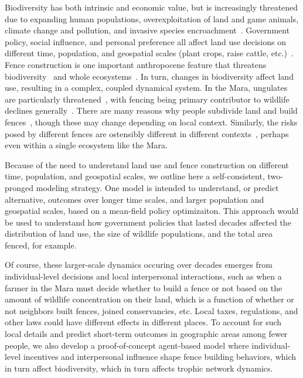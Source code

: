 \documentclass{article}
\theoremstyle{mytheorem}
\theoremstyle{myremark}
\begin{document}
Biodiversity has both intrinsic and economic value, but is increasingly threatened
due to expanding human populations, overexploitation of land and game animals,
climate change and pollution, and invasive species encroachment~\cite{Bellard2022}.
Government policy, social influence, and personal preference all affect land use
decisions on different time, population, and geospatial scales 
(plant crops, raise cattle, etc.)~\cite{Eitzel2020,Løvschal2021}.
Fence construction is one important anthropocene feature that threatens
biodiversity~\cite{Packer2013} and whole 
ecosystems~\cite{Løvschal2017,Løvschal2022}. 
In turn, changes in biodiversity affect land use, resulting in a complex, coupled
dynamical system. In the Mara, 
ungulates are particularly threatened~\cite{Ogutu2009}, with fencing being primary
contributor to wildlife declines generally~\cite{Ogutu2016}. 
There are many reasons why people subdivide land and build
fences~\cite{Mwangi2007}, though these may change depending on local context.
Similarly, the risks posed by different fences are ostensibly
different in different contexts~\cite{Bellard2022}, perhaps even within
a single ecosystem like the Mara. 

Because of the need to understand land use and
fence construction on different time, population, and geospatial scales, we
outline here a self-consistent, two-pronged modeling strategy. One 
model is intended to understand, or predict alternative, outcomes over 
longer time scales, and larger population and geospatial scales,
based on a mean-field policy optimizaiton. This approach would be used to 
understand how government policies that lasted decades affected the distribution of
land use, the size of wildlife populations, and the total area fenced, for example.

Of course, these larger-scale dynamics occuring over decades emerges from
individual-level decisions and local interpersonal interactions, such as 
when a farmer in the Mara must decide whether to build a fence or not based on
the amount of wildlife concentration on their land, which is a function of whether or
not neighbors built fences, joined conservancies, etc. Local taxes,
regulations, and other laws could have different effects in different places.
To account for such local details and predict short-term outcomes in geographic areas
among fewer people, we also develop a proof-of-concept agent-based model where
individual-level incentives and interpersonal influence shape fence building
behaviors, which in turn affect biodiversity, which in turn affects trophic network
dynamics. 
\end{document}
